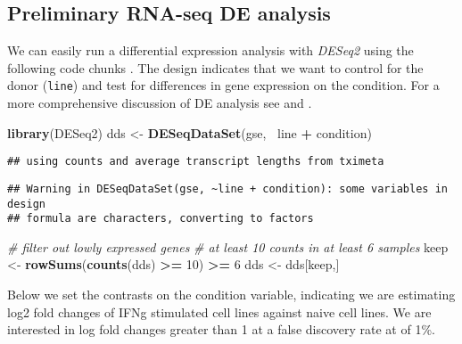 \documentclass[
  9pt,
  a4paper,
]{extarticle}
\newenvironment{Shaded}{\begin{snugshade}}{\end{snugshade}}
\newcommand{\CommentTok}[1]{\textcolor[rgb]{0.56,0.35,0.01}{\textit{#1}}}
\newcommand{\DecValTok}[1]{\textcolor[rgb]{0.00,0.00,0.81}{#1}}
\newcommand{\KeywordTok}[1]{\textcolor[rgb]{0.13,0.29,0.53}{\textbf{#1}}}
\newcommand{\NormalTok}[1]{#1}
\newcommand{\OperatorTok}[1]{\textcolor[rgb]{0.81,0.36,0.00}{\textbf{#1}}}
\newcommand{\StringTok}[1]{\textcolor[rgb]{0.31,0.60,0.02}{#1}}
\begin{document}
\hypertarget{preliminary-rna-seq-de-analysis}{%
\subsection{Preliminary RNA-seq DE analysis}\label{preliminary-rna-seq-de-analysis}}

We can easily run a differential expression analysis with \emph{DESeq2} using the
following code chunks \citep{Love2014}. The design indicates that we want to control
for the donor (\texttt{line}) and test for differences in gene expression on the
condition. For a more comprehensive discussion of DE analysis see
\citet{Love2016-f1000} and \citet{Law2018-f1000}.

\begin{Shaded}
\begin{Highlighting}[]
\KeywordTok{library}\NormalTok{(DESeq2)}
\NormalTok{dds <-}\StringTok{ }\KeywordTok{DESeqDataSet}\NormalTok{(gse, }\OperatorTok{~}\NormalTok{line }\OperatorTok{+}\StringTok{ }\NormalTok{condition)}
\end{Highlighting}
\end{Shaded}

\begin{verbatim}
## using counts and average transcript lengths from tximeta
\end{verbatim}

\begin{verbatim}
## Warning in DESeqDataSet(gse, ~line + condition): some variables in design
## formula are characters, converting to factors
\end{verbatim}

\begin{Shaded}
\begin{Highlighting}[]
\CommentTok{# filter out lowly expressed genes}
\CommentTok{# at least 10 counts in at least 6 samples}
\NormalTok{keep <-}\StringTok{ }\KeywordTok{rowSums}\NormalTok{(}\KeywordTok{counts}\NormalTok{(dds) }\OperatorTok{>=}\StringTok{ }\DecValTok{10}\NormalTok{) }\OperatorTok{>=}\StringTok{ }\DecValTok{6}
\NormalTok{dds <-}\StringTok{ }\NormalTok{dds[keep,]}
\end{Highlighting}
\end{Shaded}

Below we set the contrasts on the condition variable, indicating we are
estimating log2 fold changes of IFNg stimulated cell lines against naive cell
lines. We are interested in log fold changes greater than 1 at a false
discovery rate at of 1\%.
\end{document}
